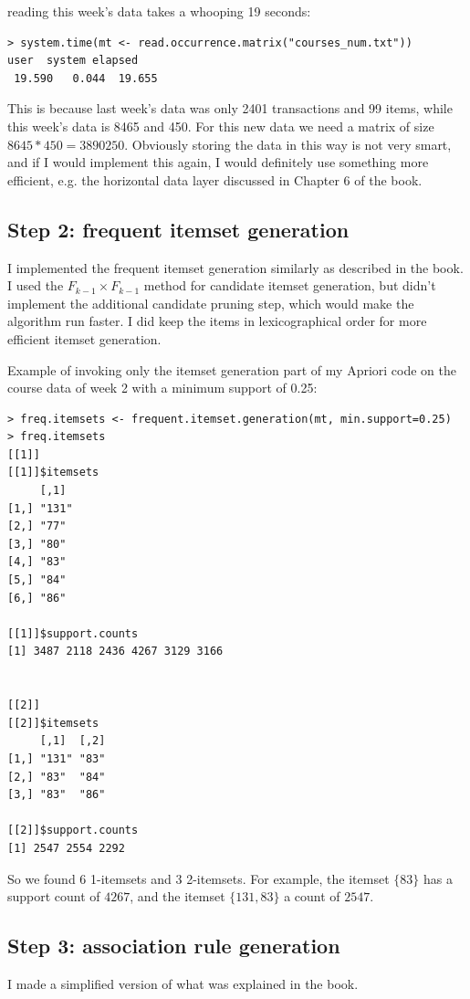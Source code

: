 \documentclass[a4paper,12pt]{article}
\begin{document}
reading this week's data takes a whooping 19 seconds:
\begin{verbatim}
> system.time(mt <- read.occurrence.matrix("courses_num.txt"))
user  system elapsed
 19.590   0.044  19.655
\end{verbatim}

This is because last week's data was only 2401 transactions and 99 items,
while this week's data is 8465 and 450. For this new data we need a matrix of
size $8645 * 450 = 3890250$. Obviously storing the data in this way is not very
smart, and if I would implement this again, I would definitely use something
more efficient, e.g. the horizontal data layer discussed in Chapter 6 of the
book.

\subsection*{Step 2: frequent itemset generation}
I implemented the frequent itemset generation similarly as described in the
book. I used the $F_{k-1} \times F_{k-1}$ method for candidate itemset
generation, but didn't implement the additional candidate pruning step, which
would make the algorithm run faster. I did keep the items in lexicographical
order for more efficient itemset generation.

Example of invoking only the itemset generation part of my Apriori code on the
course data of week 2 with a minimum support of 0.25:
\begin{verbatim}
> freq.itemsets <- frequent.itemset.generation(mt, min.support=0.25)
> freq.itemsets
[[1]]
[[1]]$itemsets
     [,1] 
[1,] "131"
[2,] "77" 
[3,] "80" 
[4,] "83" 
[5,] "84" 
[6,] "86" 

[[1]]$support.counts
[1] 3487 2118 2436 4267 3129 3166


[[2]]
[[2]]$itemsets
     [,1]  [,2]
[1,] "131" "83"
[2,] "83"  "84"
[3,] "83"  "86"

[[2]]$support.counts
[1] 2547 2554 2292
\end{verbatim}

So we found 6 1-itemsets and 3 2-itemsets. For example, the itemset $\{83\}$
has a support count of $4267$, and the itemset $\{131, 83\}$ a count of
$2547$.

\subsection*{Step 3: association rule generation}
I made a simplified version of what was explained in the book.
\end{document}
